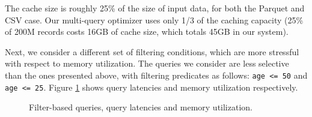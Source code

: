 The cache size is roughly 25\% of the size of input data, for both the Parquet and CSV case. Our multi-query optimizer uses only 1/3 of the caching capacity (25\% of 200M records costs 16GB of cache size, which totals 45GB in our system).

Next, we consider a different set of filtering conditions, which are more stressful with respect to memory utilization. The queries we consider are less selective than the ones presented above, with filtering predicates as follows: \texttt{age <= 50} and \texttt{age <= 25}. Figure \ref{fig:query1_50} shows query latencies and memory utilization respectively.

\begin{figure}[htbp]
	\centering



   \caption{Filter-based queries, query latencies and memory utilization.}
   \label{fig:query1_50}
\end{figure}

